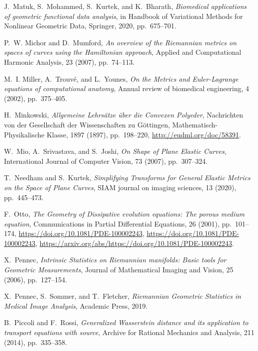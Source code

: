 \documentclass[final,hidelinks,onefignum,onetabnum]{siamart220329}
\begin{document}
\begin{thebibliography}{10}
{\sc J.~Matuk, S.~Mohammed, S.~Kurtek, and K.~Bharath}, {\em Biomedical applications of geometric functional data analysis}, in Handbook of Variational Methods for Nonlinear Geometric Data, Springer, 2020, pp.~675--701.

{\sc P.~W. Michor and D.~Mumford}, {\em An overview of the Riemannian metrics on spaces of curves using the Hamiltonian approach}, Applied and Computational Harmonic Analysis, 23 (2007), pp.~74--113.

{\sc M.~I. Miller, A.~Trouv{\'e}, and L.~Younes}, {\em On the Metrics and Euler-Lagrange equations of computational anatomy}, Annual review of biomedical engineering, 4 (2002), pp.~375--405.

{\sc H.~Minkowski}, {\em Allgemeine Lehrsätze über die Convexen Polyeder}, Nachrichten von der Gesellschaft der Wissenschaften zu Göttingen, Mathematisch-Physikalische Klasse, 1897 (1897), pp.~198--220, \url{http://eudml.org/doc/58391}.

{\sc W.~Mio, A.~Srivastava, and S.~Joshi}, {\em On Shape of Plane Elastic Curves}, International Journal of Computer Vision, 73 (2007), pp.~307--324.

{\sc T.~Needham and S.~Kurtek}, {\em Simplifying Transforms for General Elastic Metrics on the Space of Plane Curves}, SIAM journal on imaging sciences, 13 (2020), pp.~445--473.

{\sc F.~Otto}, {\em The Geometry of Dissipative evolution equations: The porous medium equation}, Communications in Partial Differential Equations, 26 (2001), pp.~101--174, \url{https://doi.org/10.1081/PDE-100002243}, \url{https://doi.org/10.1081/PDE-100002243}, \url{https://arxiv.org/abs/https://doi.org/10.1081/PDE-100002243}.

{\sc X.~Pennec}, {\em Intrinsic Statistics on Riemannian manifolds: Basic tools for Geometric Measurements}, Journal of Mathematical Imaging and Vision, 25 (2006), pp.~127--154.

{\sc X.~Pennec, S.~Sommer, and T.~Fletcher}, {\em Riemannian Geometric Statistics in Medical Image Analysis}, Academic Press, 2019.

{\sc B.~Piccoli and F.~Rossi}, {\em Generalized {W}asserstein distance and its application to transport equations with source}, Archive for Rational Mechanics and Analysis, 211 (2014), pp.~335--358.


\end{thebibliography}
\end{document}
